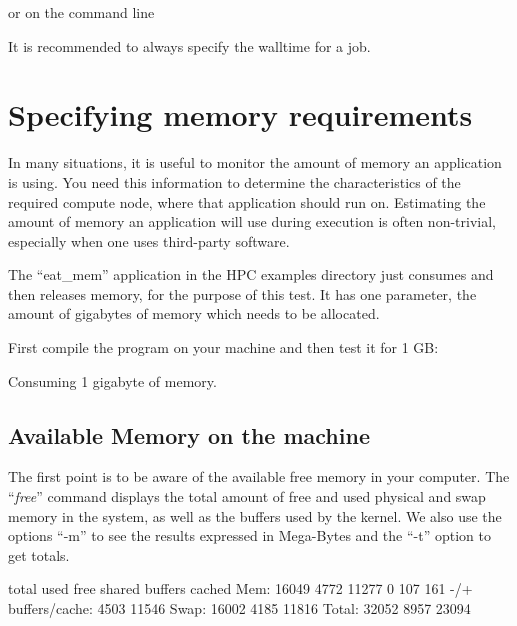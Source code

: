 or on the command line
\begin{prompt}
\end{prompt}

It is recommended to always specify the walltime for a job.

\section{Specifying memory requirements}

In many situations, it is useful to monitor the amount of memory an application
is using. You need this information to determine the characteristics of the
required compute node, where that application should run on.  Estimating the
amount of memory an application will use during execution is often non-trivial,
especially when one uses third-party software.

\ifgent
\else
  The ``eat\_mem'' application in the HPC examples directory just consumes and then releases memory, for the
  purpose of this test. It has one parameter, the amount of gigabytes of memory
  which needs to be allocated.
  
  First compile the program on your machine and then test it for 1 GB:
  \begin{prompt}
  Consuming 1 gigabyte of memory.
  \end{prompt}
\fi


\subsection{Available Memory on the machine}

The first point is to be aware of the available free memory in your computer.
The ``\emph{free}'' command displays the total amount of free and used
physical and swap memory in the system, as well as the buffers used by the
kernel. We also use the options ``-m'' to see the results expressed in
Mega-Bytes and the ``-t'' option to get totals.

\begin{prompt}
                total   used   free  shared  buffers  cached
Mem:            16049   4772  11277       0      107     161
-/+ buffers/cache:      4503  11546
Swap:           16002   4185  11816
Total:          32052   8957  23094
\end{prompt}

